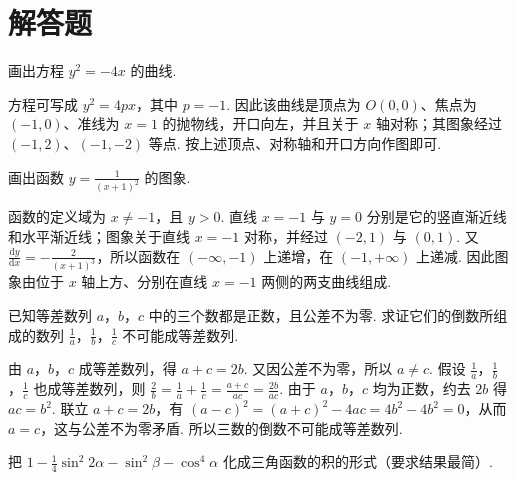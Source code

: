 \documentclass[UTF8,a4paper,oneside,11pt]{ctexbook}
\begin{document}
\section{解答题}

\begin{problem}

画出方程 \(y^{2} = -4x \) 的曲线.
\end{problem}

\begin{solution}
方程可写成 \(y^{2}=4px\)，其中 \(p=-1\). 因此该曲线是顶点为 \(O(0,0)\)、焦点为 \((-1,0)\)、准线为 \(x=1\) 的抛物线，开口向左，并且关于 \(x\) 轴对称；其图象经过 \((-1,2)\)、\((-1,-2)\) 等点. 按上述顶点、对称轴和开口方向作图即可.
\end{solution}

\begin{problem}

画出函数 \(y = \frac{1}{(x + 1)^2} \) 的图象.
\end{problem}

\begin{solution}
函数的定义域为 \(x\ne-1\)，且 \(y>0\). 直线 \(x=-1\) 与 \(y=0\) 分别是它的竖直渐近线和水平渐近线；图象关于直线 \(x=-1\) 对称，并经过 \((-2,1)\) 与 \((0,1)\). 又 \(\displaystyle\frac{\mathrm{d}y}{\mathrm{d}x}=-\frac{2}{(x+1)^{3}}\)，所以函数在 \((-\infty,-1)\) 上递增，在 \((-1,+\infty)\) 上递减. 因此图象由位于 \(x\) 轴上方、分别在直线 \(x=-1\) 两侧的两支曲线组成.
\end{solution}

\begin{problem}

已知等差数列 \(a\)，\(b\)，\(c\) 中的三个数都是正数，且公差不为零. 求证它们的倒数所组成的数列 \(\frac{1}{a}\)，\(\frac{1}{b}\)，\(\frac{1}{c}\) 不可能成等差数列.
\end{problem}

\begin{solution}
由 \(a\)，\(b\)，\(c\) 成等差数列，得 \(a+c=2b\). 又因公差不为零，所以 \(a\ne c\). 假设 \(\frac{1}{a}\)，\(\frac{1}{b}\)，\(\frac{1}{c}\) 也成等差数列，则 \(\displaystyle\frac{2}{b}=\frac{1}{a}+\frac{1}{c}=\frac{a+c}{ac}=\frac{2b}{ac}\). 由于 \(a\)，\(b\)，\(c\) 均为正数，约去 \(2b\) 得 \(ac=b^{2}\). 联立 \(a+c=2b\)，有 \(\displaystyle(a-c)^{2}=(a+c)^{2}-4ac=4b^{2}-4b^{2}=0\)，从而 \(a=c\)，这与公差不为零矛盾. 所以三数的倒数不可能成等差数列.
\end{solution}

\begin{problem}

把 \(1 - \frac{1}{4}\sin^2 2\alpha -\sin^2\beta -\cos^4\alpha\) 化成三角函数的积的形式（要求结果最简）.
\end{problem}
\end{document}
